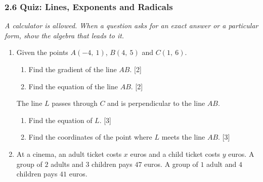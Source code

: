 \documentclass[12pt, twoside]{article}
\begin{document}
\subsubsection*{2.6 Quiz: Lines, Exponents and Radicals}

\emph{A calculator is allowed. When a question asks for an exact answer or
a particular form, show the algebra that leads to it.}

\begin{enumerate}[itemsep=0.15cm]

\item[1.] [Maximum mark: 10]

Given the points $A(-4,\ 1)$, $B(4,\ 5)$ and $C(1,\ 6)$.

\begin{enumerate}[itemsep=0.1cm]
  \item Find the gradient of the line $AB$. \hfill [2]
  \item Find the equation of the line $AB$. \hfill [2]
\end{enumerate}

The line $L$ passes through $C$ and is perpendicular to the line $AB$.

\begin{enumerate}[itemsep=0.1cm]
  \item[(c)] Find the equation of $L$. \hfill [3]
  \item[(d)] Find the coordinates of the point where $L$ meets the line
  $AB$. \hfill [3]
\end{enumerate}


\newpage

\item[2.] [Maximum mark: 7]

At a cinema, an adult ticket costs $x$ euros and a child ticket costs $y$
euros. A group of $2$ adults and $3$ children pays $47$ euros. A group of
$1$ adult and $4$ children pays $41$ euros.


\end{enumerate}
\end{document}
